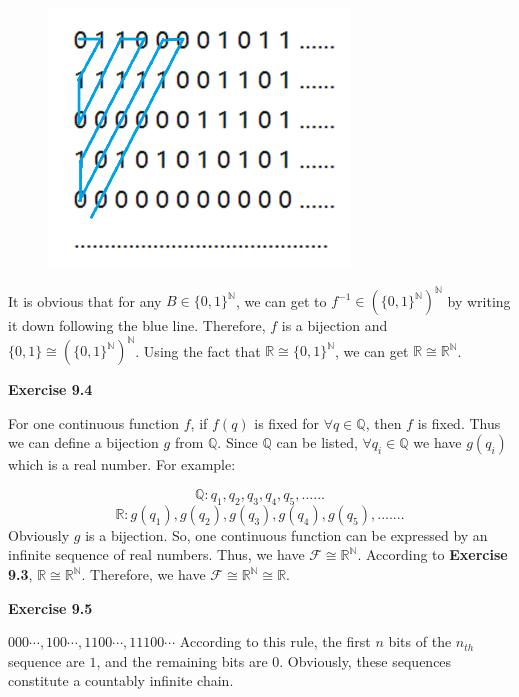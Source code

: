 \documentclass{article} %
\begin{document}
\begin{figure}[H]
    \centering
    \includegraphics[width=8cm]{9_3_1.png}
    \caption{}
    \label{}
    \end{figure}
It is obvious that for any $B\in \{0,1\}^\mathbb{N}$, we can get to $f^{-1}\in (\{0,1\}^\mathbb{N})^\mathbb{N}$ by writing it down following the blue line. Therefore, $f$ is a bijection and $\{0,1\}\cong (\{0,1\}^\mathbb{N})^\mathbb{N}$. Using the fact that $\mathbb{R}\cong \{0,1\}^\mathbb{N}$, we can get $\mathbb{R}\cong \mathbb{R}^\mathbb{N}$.\par


	\textbf{Exercise 9.4}\par
	For one continuous function $f$, if $f(q)$ is fixed for $\forall q\in \mathbb{Q}$, then $f$ is fixed.
	Thus we can define a bijection $g$ from $\mathbb{Q}$. Since $\mathbb{Q}$ can be listed, $\forall q_{i}\in \mathbb{Q}$ we have $g(q_{i})$ which is a real number.
	For example:\par
	$$
	\mathbb{Q}:q_1,q_2,q_3,q_4,q_5,......
	$$
	$$
	\mathbb{R}:g(q_1),g(q_2),g(q_3),g(q_4),g(q_5),.......
	$$
	Obviously $g$ is a bijection. So, one continuous function can be expressed by an infinite sequence of real numbers. 
	Thus, we have   $\mathcal{F} \cong \mathbb{R}^{\mathbb{N}}$. According to \textbf{Exercise 9.3},  $\mathbb{R} \cong \mathbb{R}^{\mathbb{N}}$.
	Therefore, we have $\mathcal{F} \cong \mathbb{R}^{\mathbb{N}} \cong \mathbb{R}$.\par

	\textbf{Exercise 9.5}\par
    $000\cdots,100\cdots,1100\cdots,11100\cdots$ According to this rule, the first $n$ bits of the $n_{th}$ sequence are $1$, and the remaining bits are $0$. Obviously, these sequences constitute a countably infinite chain.\par
	
\end{document}
